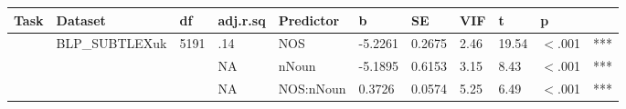 \begin{table}[ht]
\centering
\begingroup\normalsize
\begin{tabular}{lllllllllll}
  \hline
Task & Dataset & df & adj.r.sq & Predictor & b & SE & VIF & t & p &  \\ 
  \hline
 & BLP\_SUBTLEXuk & 5191 & .14 & NOS & -5.2261 & 0.2675 & 2.46 & 19.54 & $<$.001 & *** \\ 
   &  &  & NA & nNoun & -5.1895 & 0.6153 & 3.15 & 8.43 & $<$.001 & *** \\ 
   &  &  & NA & NOS:nNoun & 0.3726 & 0.0574 & 5.25 & 6.49 & $<$.001 & *** \\ 
   \hline
\end{tabular}
\endgroup
\end{table}
